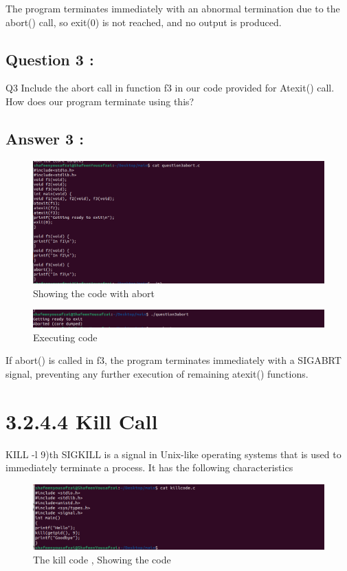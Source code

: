 \documentclass[12pt]{article}
\begin{document}
The program terminates immediately with an abnormal termination due to the abort() call, so exit(0) is not reached, and no output is produced.


\subsection{Question 3 :}
Q3 Include the abort call in function f3 in our
code provided for Atexit() call. How does
our program terminate using this?
\subsection{Answer 3 :}

\begin{figure}[H]
    \centering
    \includegraphics[width=\textwidth]{sada.png}
    \caption{Showing the code with abort}
    \label{fig:enter-label}
\end{figure}

\begin{figure}[H]
    \centering
    \includegraphics[width=\textwidth]{eqew.png}
    \caption{Executing code}
    \label{fig:enter-label}
\end{figure}

If abort() is called in f3, the program terminates immediately with a SIGABRT signal, preventing any further execution of remaining atexit() functions.

\section{3.2.4.4 Kill Call}
KILL -l
9)th    
SIGKILL is a signal in Unix-like operating systems that is used to immediately terminate a process. It has the following characteristics

\begin{figure}[H]
    \centering
    \includegraphics[width=\textwidth]{asdqw.png}
    \caption{The kill code , Showing the code}
    \label{fig:enter-label}
\end{figure}
\end{document}
